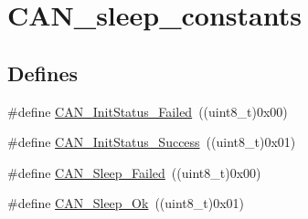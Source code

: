 \hypertarget{group__CAN__sleep__constants}{
\section{CAN\_\-sleep\_\-constants}
\label{group__CAN__sleep__constants}
}
\subsection*{Defines}
\begin{DoxyCompactItemize}
\item 
\#define \hyperlink{group__CAN__sleep__constants_ga095c319e8c54c974eb2b6eeadf180d96}{CAN\_\-InitStatus\_\-Failed}~((uint8\_\-t)0x00)
\item 
\#define \hyperlink{group__CAN__sleep__constants_ga6bed5957af8f2f6b00568e15ccac5772}{CAN\_\-InitStatus\_\-Success}~((uint8\_\-t)0x01)
\item 
\#define \hyperlink{group__CAN__sleep__constants_ga169500ab7169c4e9c7e9e4ea34b3e070}{CAN\_\-Sleep\_\-Failed}~((uint8\_\-t)0x00)
\item 
\#define \hyperlink{group__CAN__sleep__constants_gaf5c4e9d32d4faff9d0bf61e153ed7998}{CAN\_\-Sleep\_\-Ok}~((uint8\_\-t)0x01)
\end{DoxyCompactItemize}


